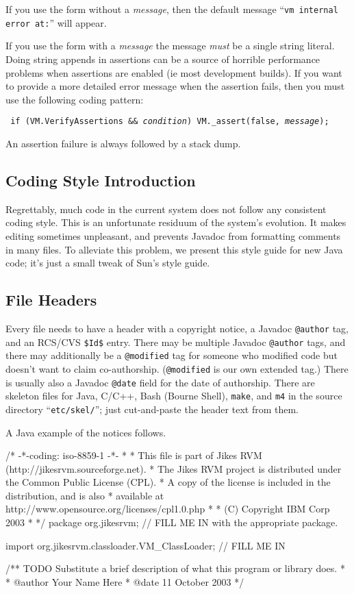 If you use the form without a {\it message}, then the default message
``{\tt vm internal error at:}''  will appear.  

If you use the form with a {\it message} the message {\em must} be a
single string literal.  Doing string appends in assertions can be a
source of horrible performance problems when assertions are enabled
(ie most development builds).  If you want to provide a
more detailed error message when the assertion fails, then you must
use the following coding pattern:
\begin{example}
\tt{}   if (VM.VerifyAssertions && {\it condition}) VM._assert(false, {\it message});
\end{example}

An assertion failure is always followed by a stack dump.


\subsection{Coding Style Introduction}

Regrettably, much code in the current system does not follow any
consistent coding style.  This is an unfortunate residuum of the
system's evolution.  It makes editing sometimes unpleasant, and
prevents Javadoc\TMweb{} from formatting comments in many files.  To alleviate
this problem, we present this style guide for new Java\TMweb{} code; it's just
a small tweak of Sun\Rweb{}'s style guide.

\subsection{File Headers}

Every file needs to have a header with a copyright notice, a Javadoc\TMweb{}
{\tt @author} tag, and an RCS/CVS {\tt \$Id\$} entry. There may be
multiple Javadoc {\tt @author} tags, and there may
additionally be a {\tt @modified} tag for someone who modified code but
doesn't want to claim co-authorship.  ({\tt @modified} is our own
extended tag.)  There is usually also a Javadoc {\tt @date} field for
the date of authorship.  There are skeleton files for Java, C/C++,
Bash (Bourne Shell), \texttt{make}, and \texttt{m4} in the source directory
``\texttt{etc/skel/}''; just cut-and-paste the header text from them.  

A Java example of the notices follows.

\begin{example}
/* -*-coding: iso-8859-1 -*-
 *
 * This file is part of Jikes RVM (http://jikesrvm.sourceforge.net).
 * The Jikes RVM project is distributed under the Common Public License (CPL).
 * A copy of the license is included in the distribution, and is also
 * available at http://www.opensource.org/licenses/cpl1.0.php
 *
 * (C) Copyright IBM Corp 2003
 *
 */
package org.jikesrvm;       // FILL ME IN with the appropriate package.

import org.jikesrvm.classloader.VM_ClassLoader; // FILL ME IN 

/** TODO Substitute a brief description of what this program or library does.
 *
 * @author Your Name Here
 * @date 11 October 2003
 */
\end{example}

